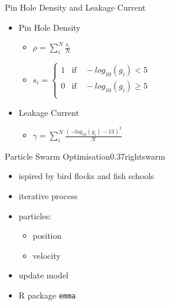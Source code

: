 \documentclass[hyperref={pdfpagelabels=false}, aspectratio=43, t]{beamer}  %
\begin{document}
\begin{frame}{Pin Hole Density and Leakage Current}
	\vspace{2em}
	\begin{itemize}
		\item Pin Hole Density 
			\begin{itemize}
				\item $
	\rho = \sum_i^N \frac{s_i}{N}
					$
				\item $
	s_i = \begin{cases}
        1 &\text{if} \quad -log_{10}(g_i) < 5 \\
        0 &\text{if} \quad -log_{10}(g_i) \geq 5 \\
	\end{cases}
					$
			\end{itemize}
	\vspace{0.5em}
		\item Leakage Current 
			\begin{itemize}
				\item $
    \gamma = \sum_i^N \frac{ (-log_{10}(g_i) - 13)^2}{N}
	$
			\end{itemize}
	\end{itemize}
\end{frame}
\begin{graphicsFrame}{Particle Swarm Optimisation}{}{0.37}{right}{swarm}{}
	\vspace{2em}
	\begin{itemize}
		\item ispired by bird flocks and fish schools %
		\item iterative process %
		\item particles: 
			\begin{itemize}
				\item position 
				\item velocity
			\end{itemize}
		\item update model
		\item R package \texttt{emma} 
	\end{itemize}
\end{graphicsFrame}
\end{document}
